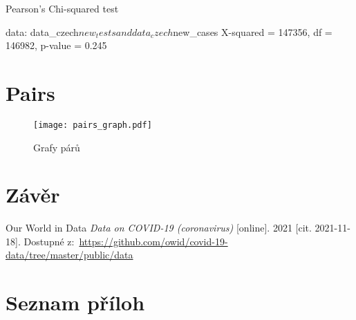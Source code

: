 \documentclass[a4paper]{ article}
\begin{document}
\begin{Schunk}
\begin{Soutput}
	Pearson's Chi-squared test

data:  data_czech$new_tests and data_czech$new_cases
X-squared = 147356, df = 146982, p-value = 0.245
\end{Soutput}
\end{Schunk}

\section{Pairs}

\begin{figure}[H]
\centering
\texttt{[image: pairs\_graph.pdf]}
\caption{Grafy párů}
\end{figure}

\clearpage


\clearpage {} {}
\section*{Závěr}


\clearpage {} {}

\begin{thebibliography}{99}	%


Our World in Data
\textit{Data on COVID-19 (coronavirus)} [online]. 2021 [cit. 2021-11-18]. Dostupné z:~\url{https://github.com/owid/covid-19-data/tree/master/public/data}

\end{thebibliography}


\clearpage {} {}
\section*{Seznam příloh}
\end{document}
